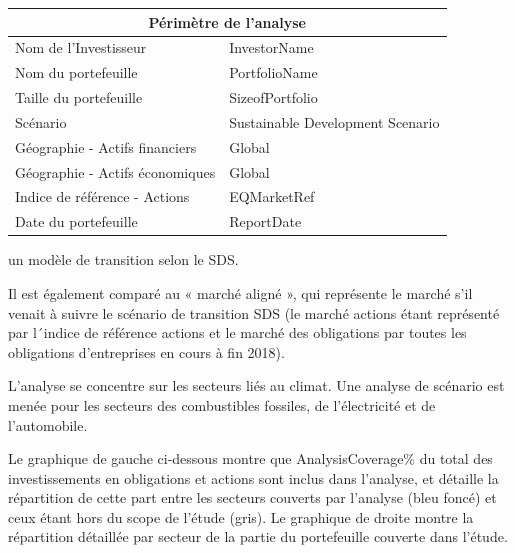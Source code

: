 \documentclass[10pt,table,a4]{article}\usepackage[]{graphicx}\usepackage[]{color}
\begin{document}
\begin{multicols}{2}
		\begin{center}
			{
				\setlength{\tabcolsep}{10pt} %
				\renewcommand{\arraystretch}{1.5} %
				\begin{tabular}{ p{.40\linewidth} p{.43\linewidth} }
					\hline
					\multicolumn{2}{c}{\textbf{Périmètre de l'analyse}} \\
					\hline
					Nom de l'Investisseur & InvestorName \\ 
					Nom du portefeuille & PortfolioName \\ 
					Taille du portefeuille & SizeofPortfolio \\ 
					Scénario &  Sustainable Development Scenario\\ 
					Géographie - \newline Actifs financiers & Global \\ 
					Géographie - \newline Actifs économiques & Global \\ 
					Indice de référence - Actions & EQMarketRef \\
					Date du portefeuille & ReportDate \\ 
					\hline
				\end{tabular}
			}
			
		\end{center}
	
	un modèle de transition selon le SDS.
	
	 		Il est également comparé au « marché aligné », qui représente le marché s'il venait à suivre le scénario de transition SDS (le marché actions étant représenté par l´indice de référence actions et le marché des obligations par toutes les obligations d’entreprises en cours à fin 2018). 
	
	L'analyse se concentre sur les secteurs liés au climat. Une analyse de scénario est menée pour les secteurs des combustibles fossiles, de l'électricité et de l'automobile.%
	
	Le graphique de gauche ci-dessous montre que AnalysisCoverage\% du total des investissements en obligations et actions sont inclus dans l'analyse, et détaille la répartition de cette part entre les secteurs couverts par l'analyse (bleu foncé) et ceux étant hors du scope de l'étude (gris). Le graphique de droite montre la répartition détaillée par secteur de la partie du portefeuille couverte dans l'étude.
		
		
		
		
		
		\vspace{-1cm}
		
		
	\end{multicols}	
\end{document}
